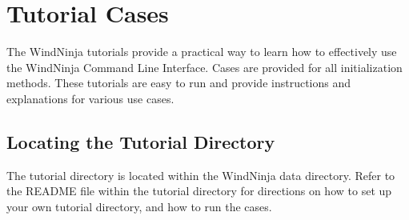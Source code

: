 \documentclass[12pt]{article}
\begin{document}
%
%
%

\section*{Tutorial Cases}

The WindNinja tutorials provide a practical way to learn how to effectively use the WindNinja Command Line Interface. Cases are provided for all initialization methods. These tutorials are easy to run and provide instructions and explanations for various  use cases.

\subsection*{   Locating the Tutorial Directory}
The tutorial directory is located within the WindNinja data directory. Refer to the README file within the tutorial directory for directions on how to set up your own tutorial directory, and how to run the cases.  
\end{document}

